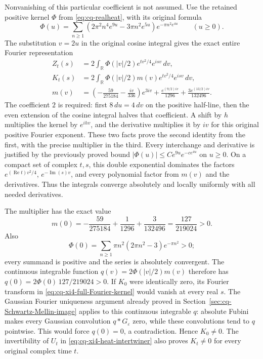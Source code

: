 Nonvanishing of this particular coefficient is not assumed.
Use the retained positive kernel $\Phi$ from
\eqref{eq:cq-realheat}, with its original formula
\[
 \Phi(u)=\sum_{n\geq1}
 (2\pi^2n^4e^{9u}-3\pi n^2e^{5u})e^{-\pi n^2e^{4u}}
 \qquad(u\geq0).
\]
The substitution $v=2u$ in the original cosine integral gives
the exact entire Fourier representation
\begin{equation}\label{eq:cq-xi4-full-Fourier-kernel}
 \begin{aligned}
 Z_t(s)&=2\int_{\mathbb R}
          \Phi(|v|/2)e^{tv^2/4}e^{isv}\,dv,\\
 K_t(s)&=2\int_{\mathbb R}
          \Phi(|v|/2)m(v)e^{tv^2/4}e^{isv}\,dv,\\
 m(v)&=\left(-\frac{59}{275184}-\frac{iv}{336}\right)e^{3iv}
          +\frac{e^{(9/2)iv}}{1296}
          +\frac{3e^{(13/2)iv}}{132496}.
 \end{aligned}
\end{equation}
The coefficient $2$ is required: first $8\,du=4\,dv$ on
the positive half-line, then the even extension of the cosine
integral halves that coefficient. A shift by $h$ multiplies
the kernel by $e^{ihv}$, and the derivative multiplies it by
$iv$ for this original positive Fourier exponent.
These two facts prove the second identity from the first,
with the precise multiplier in the third.
Every interchange and derivative is justified by the previously
proved bound
$|\Phi(u)|\leq Ce^{9u}e^{-ce^{4u}}$ on $u\geq0$.
On a compact set of complex $t,s$, this double exponential
dominates the factors $e^{(\operatorname{Re}t)v^2/4}$,
$e^{-\operatorname{Im}(s)v}$, and every polynomial factor
from $m(v)$ and the derivatives. Thus the integrals converge
absolutely and locally uniformly with all needed derivatives.

The multiplier has the exact value
\begin{equation}\label{eq:cq-xi4-nonzero-multiplier}
 m(0)=-\frac{59}{275184}+\frac1{1296}
                    +\frac3{132496}=\frac{127}{219024}>0.
\end{equation}
Also
\[
 \Phi(0)=\sum_{n\geq1}
       \pi n^2(2\pi n^2-3)e^{-\pi n^2}>0;
\]
every summand is positive and the series is absolutely
convergent. The continuous integrable function
$q(v)=2\Phi(|v|/2)m(v)$ therefore has
$q(0)=2\Phi(0)\,127/219024>0$.
If $K_0$ were identically zero, its Fourier transform in
\eqref{eq:cq-xi4-full-Fourier-kernel} would vanish at every
real $s$. The Gaussian Fourier uniqueness argument already
proved in Section~\ref{sec:cq-Schwartz-Mellin-image} applies
to this continuous integrable $q$: absolute Fubini makes
every Gaussian convolution $q*G_\varepsilon$ zero, while
these convolutions tend to $q$ pointwise. This would force
$q(0)=0$, a contradiction. Hence $K_0\ne0$.
The invertibility of $U_t$ in
\eqref{eq:cq-xi4-heat-intertwiner} also proves $K_t\ne0$
for every original complex time $t$.

